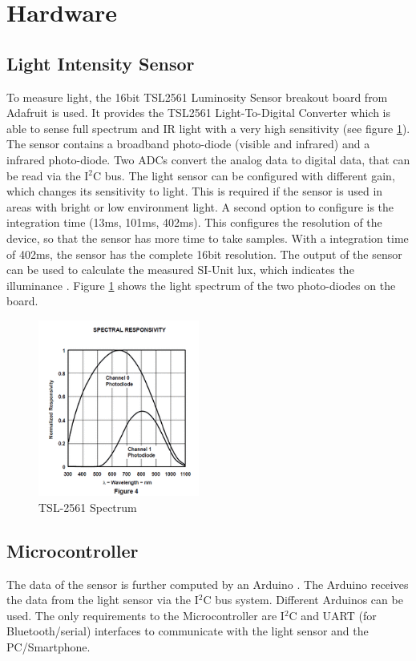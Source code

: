 \documentclass[notitlepage]{scrreprt}
\begin{document}
\section{Hardware}
\subsection{Light Intensity Sensor}
To measure light, the 16bit TSL2561 Luminosity Sensor breakout board from Adafruit is used. It provides the TSL2561 Light-To-Digital Converter which is able to sense full spectrum and IR light with a very high sensitivity (see figure \ref{fig:tsl-2561-spectrum}). The sensor contains a broadband photo-diode (visible and infrared) and a infrared photo-diode. Two ADCs convert the analog data to digital data, that can be read via the I$^{2}$C bus. The light sensor can be configured with different gain, which changes its sensitivity to light. This is required if the sensor is used in areas with bright or low environment light. A second option to configure is the integration time (13ms, 101ms, 402ms). This configures the resolution of the device, so that the sensor has more time to take samples. With a integration time of 402ms, the sensor has the complete 16bit resolution. The output of the sensor can be used to calculate the measured SI-Unit lux, which indicates the illuminance \cite{bib:tsl-sensor}. Figure \ref{fig:tsl-2561-spectrum} shows the light spectrum of the two photo-diodes on the board.

\begin{figure}[H]
	\centering
	\includegraphics[width=200px]{images/light_tsl2561spectrum.png}
	\caption{TSL-2561 Spectrum}
	\label{fig:tsl-2561-spectrum}
\end{figure}

\subsection{Microcontroller}
The data of the sensor is further computed by an Arduino \cite{bib:arduino-board}. The Arduino receives the data from the light sensor via the I$^{2}$C bus system. Different Arduinos can be used. The only requirements to the Microcontroller are I$^{2}$C and UART (for Bluetooth/serial) interfaces to communicate with the light sensor and the PC/Smartphone.
\end{document}
